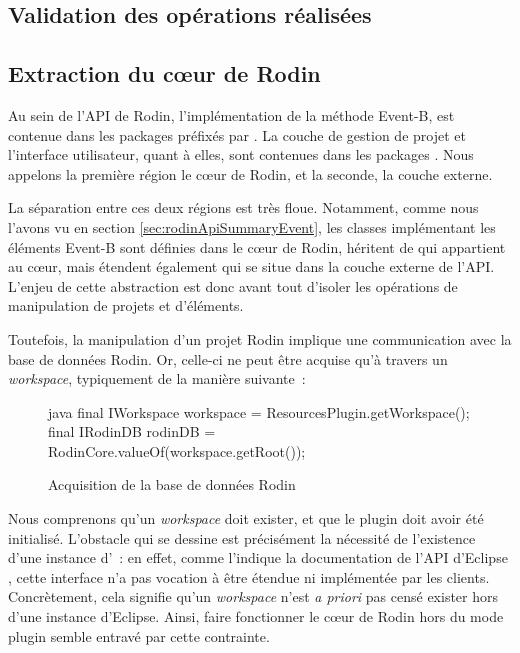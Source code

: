 \subsection{Validation des opérations réalisées}


\subsection{Extraction du cœur de Rodin}

Au sein de l'API de Rodin, l'implémentation de la méthode Event-B, est contenue dans les packages préfixés par .
La couche de gestion de projet et l'interface utilisateur, quant à elles, sont contenues dans les packages .
Nous appelons la première région le cœur de Rodin, et la seconde, la couche externe.

La séparation entre ces deux régions est très floue.
Notamment, comme nous l'avons vu en section \ref{sec:rodinApiSummaryEvent}, les classes implémentant les éléments Event-B sont définies dans le cœur de Rodin, %
héritent de  qui appartient au cœur, mais étendent également  qui se situe dans la couche externe de l'API.
L'enjeu de cette abstraction est donc avant tout d'isoler les opérations de manipulation de projets et d'éléments.

Toutefois, la manipulation d'un projet Rodin implique une communication avec la base de données Rodin.
Or, celle-ci ne peut être acquise qu'à travers un \textit{workspace}, typiquement de la manière suivante~:

\begin{figure}[H]
\centering
\begin{imtaCode}{java}
final IWorkspace workspace = ResourcesPlugin.getWorkspace();
final IRodinDB rodinDB = RodinCore.valueOf(workspace.getRoot());
\end{imtaCode}
\caption{Acquisition de la base de données Rodin}
\label{fig:rodinDbAccess}
\end{figure}

Nous comprenons qu'un \textit{workspace} doit exister, et que le plugin  doit avoir été initialisé.
L'obstacle qui se dessine est précisément la nécessité de l'existence d'une instance d'~: en effet, comme l'indique la documentation %
de l'API d'Eclipse \cite{eclipseiworkspace}, cette interface n'a pas vocation à être étendue ni implémentée par les clients.
Concrètement, cela signifie qu'un \textit{workspace} n'est \textit{a priori} pas censé exister hors d'une instance d'Eclipse.
Ainsi, faire fonctionner le cœur de Rodin hors du mode plugin semble entravé par cette contrainte.

